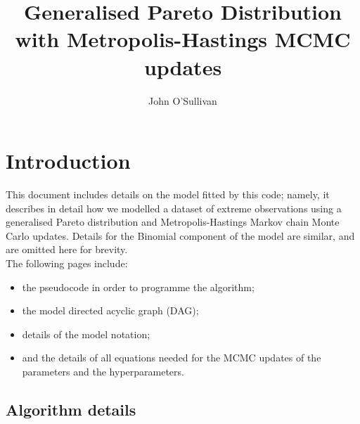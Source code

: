 \documentclass{article}
\begin{document}
\title{Generalised Pareto Distribution with Metropolis-Hastings MCMC updates}
\author{John O'Sullivan}
\maketitle

\section*{Introduction} \label{sec3:appenda} %
%
This document includes details on the model fitted by this code; namely, it describes in detail how we modelled a dataset of extreme observations using a generalised Pareto distribution and Metropolis-Hastings Markov chain Monte Carlo updates. Details for the Binomial component of the model are similar, and are omitted here for brevity.
\\

The following pages include:
\begin{itemize}
\itemsep-0.4em
\item the pseudocode in order to programme the algorithm;
\item the model directed acyclic graph (DAG);
\item details of the model notation;
\item and the details of all equations needed for the MCMC updates of the parameters and the hyperparameters.
\end{itemize}

\subsection*{Algorithm details}

\end{document}
